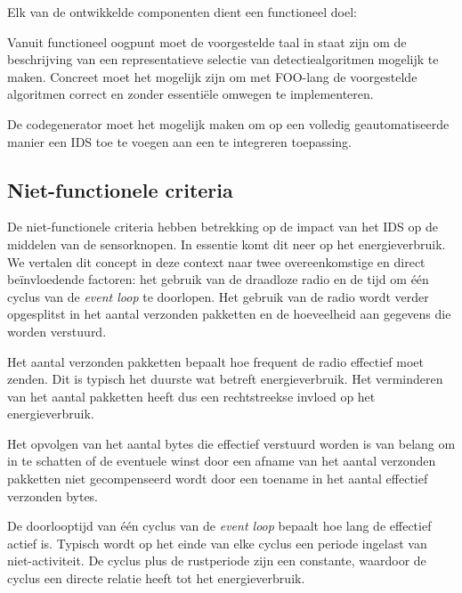 Elk van de ontwikkelde componenten dient een functioneel doel:

\begin{description}[noitemsep, topsep=0pt, partopsep=1pt]

  \item[Expressiviteit] Vanuit functioneel oogpunt moet de voorgestelde taal in
  staat zijn om de beschrijving van een representatieve selectie van
  detectiealgoritmen mogelijk te maken. Concreet moet het mogelijk zijn om met
  FOO-lang de voorgestelde algoritmen correct en zonder essenti\"ele omwegen
  te implementeren.

  \item[Automatiseerbaarheid] De codegenerator moet het mogelijk maken om op
  een volledig geautomatiseerde manier een IDS toe te voegen aan een te
  integreren toepassing.

\end{description}

\vspace{-3mm}

\subsection{Niet-functionele criteria}

De niet-functionele criteria hebben betrekking op de impact van het IDS op de
middelen van de sensorknopen. In essentie komt dit neer op het energieverbruik.
We vertalen dit concept in deze context naar twee overeenkomstige en direct
be\"invloedende factoren: het gebruik van de draadloze radio en de tijd om
\'e\'en cyclus van de \emph{event loop} te doorlopen. Het gebruik van de radio
wordt verder opgesplitst in het aantal verzonden pakketten en de hoeveelheid
aan gegevens die worden verstuurd.

\begin{description}[noitemsep, topsep=0pt, partopsep=0pt]
  
  \item[Aantal verzonden netwerkpakketten] Het aantal verzonden pakketten
  bepaalt hoe frequent de radio effectief moet zenden. Dit is typisch het
  duurste wat betreft energieverbruik. Het verminderen van het aantal pakketten
  heeft dus een rechtstreekse invloed op het energieverbruik.

  \item[Aantal verzonden bytes] Het opvolgen van het aantal bytes die effectief
  verstuurd worden is van belang om in te schatten of de eventuele winst door
  een afname van het aantal verzonden pakketten niet gecompenseerd wordt door
  een toename in het aantal effectief verzonden bytes.

  \item[Lengte event loop] De doorlooptijd van \'e\'en cyclus van de
  \emph{event loop} bepaalt hoe lang de \mcu effectief actief is. Typisch wordt
  op het einde van elke cyclus een periode ingelast van niet-activiteit. De
  cyclus plus de rustperiode zijn een constante, waardoor de cyclus een directe
  relatie heeft tot het energieverbruik.
  
\end{description}

